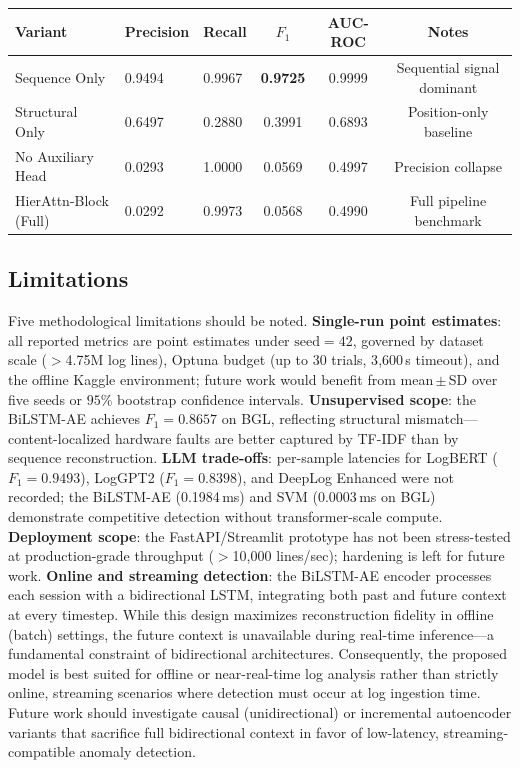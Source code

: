 \documentclass{elektr}
\begin{document}
\begin{table}[h!]
\begin{center}
{\begin{tabular}{|l|l|l|c|c|c|}
\hline
\textbf{Variant} & \textbf{Precision} & \textbf{Recall} & \textbf{$F_1$} & \textbf{AUC-ROC} & \textbf{Notes} \\
\hline
Sequence Only & 0.9494 & 0.9967 & \textbf{0.9725} & 0.9999 & Sequential signal dominant \\
Structural Only & 0.6497 & 0.2880 & 0.3991 & 0.6893 & Position-only baseline \\
No Auxiliary Head & 0.0293 & 1.0000 & 0.0569 & 0.4997 & Precision collapse \\
HierAttn-Block (Full) & 0.0292 & 0.9973 & 0.0568 & 0.4990 & Full pipeline benchmark \\
\hline
\end{tabular}%
}
\label{tab:ablation}
\end{center}\vs{-4mm}
\end{table}


\subsection{Limitations}
\label{Sec:Limitations}

Five methodological limitations should be noted.
\textbf{Single-run point estimates}: all reported metrics are point estimates under
$\text{seed}=42$, governed by dataset scale ($>$4.75M log lines), Optuna budget
(up to 30 trials, 3{,}600\,s timeout), and the offline Kaggle environment; future
work would benefit from mean\,$\pm$\,SD over five seeds or $95\%$ bootstrap
confidence intervals.
\textbf{Unsupervised scope}: the BiLSTM-AE achieves $F_1{=}0.8657$ on BGL,
reflecting structural mismatch---content-localized hardware faults are better
captured by TF-IDF than by sequence reconstruction.
\textbf{LLM trade-offs}: per-sample latencies for LogBERT ($F_1{=}0.9493$),
LogGPT2 ($F_1{=}0.8398$), and DeepLog Enhanced were not recorded; the BiLSTM-AE
(0.1984\,ms) and SVM (0.0003\,ms on BGL) demonstrate competitive detection without
transformer-scale compute.
\textbf{Deployment scope}: the FastAPI/Streamlit prototype has not been
stress-tested at production-grade throughput ($>$10{,}000 lines/sec); hardening
is left for future work.
\textbf{Online and streaming detection}: the BiLSTM-AE encoder processes each
session with a bidirectional LSTM, integrating both past and future context
at every timestep. While this design maximizes reconstruction fidelity in
offline (batch) settings, the future context is unavailable during real-time
inference---a fundamental constraint of bidirectional architectures. Consequently,
the proposed model is best suited for offline or near-real-time log analysis
rather than strictly online, streaming scenarios where detection must occur at
log ingestion time. Future work should investigate causal (unidirectional) or
incremental autoencoder variants that sacrifice full bidirectional context in
favor of low-latency, streaming-compatible anomaly detection.
\end{document}
